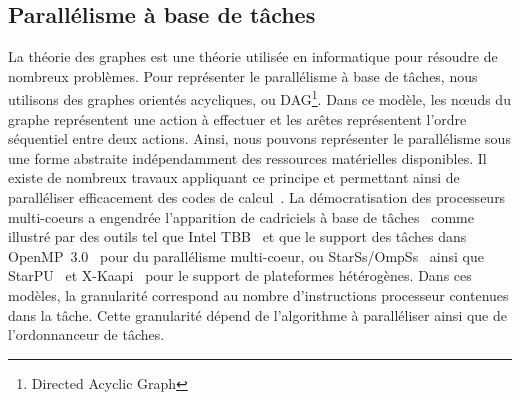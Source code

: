 \subsection{Parallélisme à base de tâches}
La théorie des graphes est une théorie utilisée en informatique pour résoudre de nombreux problèmes.
%
%
%
Pour représenter le parallélisme à base de tâches, nous utilisons des graphes orientés acycliques, ou DAG\footnote{Directed Acyclic Graph}.
%
Dans ce modèle, les n{\oe}uds du graphe représentent une action à effectuer et les arêtes représentent l'ordre séquentiel entre deux actions.
%
Ainsi, nous pouvons représenter le parallélisme sous une forme abstraite indépendamment des ressources matérielles disponibles.
%
Il existe de nombreux travaux appliquant ce principe et permettant ainsi de paralléliser efficacement des codes de calcul~\cite{BBAC2014,LSAT2013,LY2012,ABGL2013}.
%
La démocratisation des processeurs multi-coeurs a engendrée l'apparition de cadriciels à base de tâches~\cite{taskscomparison} comme illustré par des outils tel que Intel TBB~\cite{Intel_TBB} et que le support des tâches dans OpenMP~3.0~\cite{openmptasks} pour du parallélisme multi-coeur, ou StarSs/OmpSs~\cite{OMPSs} ainsi que StarPU~\cite{starpu} et X-Kaapi~\cite{xkaapi} pour le support de plateformes hétérogènes.
%
Dans ces modèles, la granularité correspond au nombre d'instructions processeur contenues dans la tâche.
%
Cette granularité dépend de l'algorithme à paralléliser ainsi que de l'ordonnanceur de tâches.

